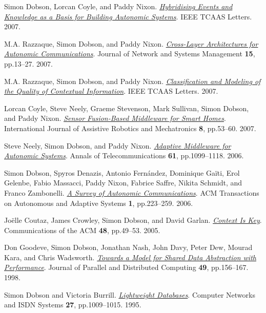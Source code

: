 \documentclass[11pt]{article}
\begin{document}
\label{org28a4a69}Simon Dobson, Lorcan Coyle, and Paddy Nixon.  \emph{\href{https://simondobson.org/softcopy/tcaas-hybrid-06.pdf}{Hybridising Events and Knowledge as a Basis for Building Autonomic Systems}}. IEEE TCAAS Letters. 2007.

\label{orga3f692a}M.A. Razzaque, Simon Dobson, and Paddy Nixon.  \emph{\href{https://simondobson.org/softcopy/jnsm-crosslayer-07.pdf}{Cross-Layer Architectures for Autonomic Communications}}. Journal of Network and Systems Management \textbf{15}, pp.13–27. 2007.

\label{org6d2703f}M.A. Razzaque, Simon Dobson, and Paddy Nixon.  \emph{\href{https://simondobson.org/softcopy/tcaas-qoc-06.pdf}{Classification and Modeling of the Quality of Contextual Information}}. IEEE TCAAS Letters. 2007.

\label{orgb45c880}Lorcan Coyle, Steve Neely, Graeme Stevenson, Mark Sullivan, Simon Dobson, and Paddy Nixon.  \emph{\href{https://simondobson.org/softcopy/smart-homes-ijarm-06.pdf}{Sensor Fusion-Based Middleware for Smart Homes}}. International Journal of Assistive Robotics and Mechatronics \textbf{8}, pp.53–60. 2007.

\label{org6f9364f}Steve Neely, Simon Dobson, and Paddy Nixon.  \emph{\href{https://simondobson.org/softcopy/aot-survey-06.pdf}{Adaptive Middleware for Autonomic Systems}}. Annals of Telecommunications \textbf{61}, pp.1099–1118. 2006.

\label{org7eb2e85}Simon Dobson, Spyros Denazis, Antonio Fernández, Dominique Gaïti, Erol Gelenbe, Fabio Massacci, Paddy Nixon, Fabrice Saffre, Nikita Schmidt, and Franco Zambonelli.  \emph{\href{https://dx.doi.org//10.1145/1186778.1186782}{A Survey of Autonomic Communications}}. ACM Transactions on Autonomous and Adaptive Systems \textbf{1}, pp.223–259. 2006.

\label{org7c72633}Joëlle Coutaz, James Crowley, Simon Dobson, and David Garlan.  \emph{\href{https://dx.doi.org//10.1145/1047671.1047703}{Context Is Key}}. Communications of the ACM \textbf{48}, pp.49–53. 2005.

\label{org9eb0e09}Don Goodeve, Simon Dobson, Jonathan Nash, John Davy, Peter Dew, Mourad Kara, and Chris Wadsworth.  \emph{\href{https://simondobson.org/softcopy/JPDC-98.pdf}{Towards a Model for Shared Data Abstraction with Performance}}. Journal of Parallel and Distributed Computing \textbf{49}, pp.156–167. 1998.

\label{orgcc26f9e}Simon Dobson and Victoria Burrill.  \emph{\href{https://dx.doi.org//10.1016/0169-7552(95)00012-V}{Lightweight Databases}}. Computer Networks and ISDN Systems \textbf{27}, pp.1009–1015. 1995.
\end{document}

